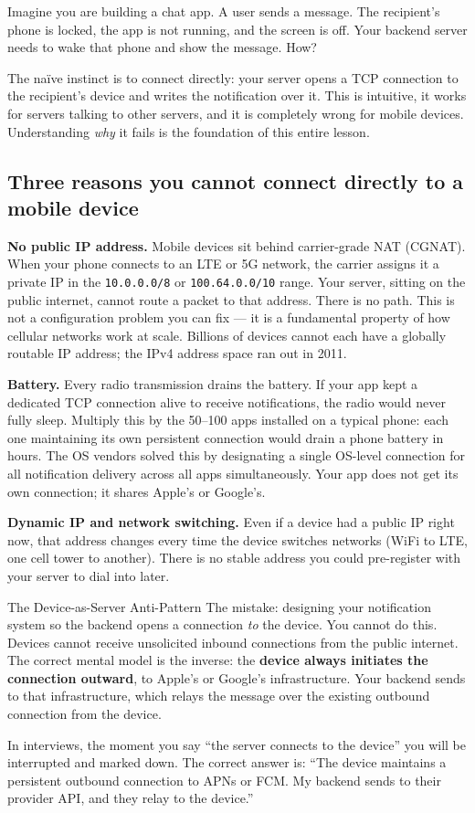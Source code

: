 \documentclass[11pt,a4paper]{article}
\begin{document}
Imagine you are building a chat app. A user sends a message. The recipient's phone is locked, the app is not running, and the screen is off. Your backend server needs to wake that phone and show the message. How?

The na\"{i}ve instinct is to connect directly: your server opens a TCP connection to the recipient's device and writes the notification over it. This is intuitive, it works for servers talking to other servers, and it is completely wrong for mobile devices. Understanding \emph{why} it fails is the foundation of this entire lesson.

\subsection{Three reasons you cannot connect directly to a mobile device}

\textbf{No public IP address.} Mobile devices sit behind carrier-grade NAT (CGNAT). When your phone connects to an LTE or 5G network, the carrier assigns it a private IP in the \texttt{10.0.0.0/8} or \texttt{100.64.0.0/10} range. Your server, sitting on the public internet, cannot route a packet to that address. There is no path. This is not a configuration problem you can fix --- it is a fundamental property of how cellular networks work at scale. Billions of devices cannot each have a globally routable IP address; the IPv4 address space ran out in 2011.

\textbf{Battery.} Every radio transmission drains the battery. If your app kept a dedicated TCP connection alive to receive notifications, the radio would never fully sleep. Multiply this by the 50--100 apps installed on a typical phone: each one maintaining its own persistent connection would drain a phone battery in hours. The OS vendors solved this by designating a single OS-level connection for all notification delivery across all apps simultaneously. Your app does not get its own connection; it shares Apple's or Google's.

\textbf{Dynamic IP and network switching.} Even if a device had a public IP right now, that address changes every time the device switches networks (WiFi to LTE, one cell tower to another). There is no stable address you could pre-register with your server to dial into later.

\begin{trapbox}{The Device-as-Server Anti-Pattern}
The mistake: designing your notification system so the backend opens a connection \emph{to} the device. You cannot do this. Devices cannot receive unsolicited inbound connections from the public internet. The correct mental model is the inverse: the \textbf{device always initiates the connection outward}, to Apple's or Google's infrastructure. Your backend sends to that infrastructure, which relays the message over the existing outbound connection from the device.

In interviews, the moment you say ``the server connects to the device'' you will be interrupted and marked down. The correct answer is: ``The device maintains a persistent outbound connection to APNs or FCM. My backend sends to their provider API, and they relay to the device.''
\end{trapbox}
\end{document}
